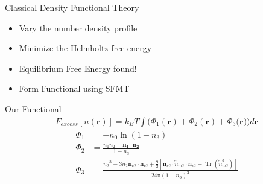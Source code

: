 \documentclass{beamer}
\renewcommand{\vec}[1]{\mathbf{#1}}
\begin{document}
\begin{frame}{Classical Density Functional Theory}
    \begin{itemize}
       \item Vary the number density profile 
       \item Minimize the Helmholtz free energy
       \item Equilibrium Free Energy found!
       \item Form Functional using SFMT
     \end{itemize}
\end{frame}


\begin{frame}{Our Functional}
\begin{align}\label{eq:Fexfunctional}
  F_{excess}[n(\vec{r})]=k_BT\int(\Phi_1(\vec{r})+\Phi_2(\vec{r})+\Phi_3(\vec{r}{)) d}\vec{r}
\end{align}
\begin{align}
\Phi_1 &= -n_{0}\ln(1-n_{3}) \\
\Phi_2 &= \frac{n_{1}n_{2}-\vec{n_{1}}\cdot\vec{n_{2}}}{1-n_{3}} \\
\Phi_3 &= \frac{{n_2}^3-3n_2\vec{n}_{v2}\cdot\vec{n}_{v2}+\frac{9}{2}[\vec{n}_{v2}\cdot{\overleftrightarrow{n}_{m2}}\cdot{\vec{n}_{v2}}-\operatorname{Tr}({\overleftrightarrow{n}^3_{m2}})]}{24\pi(1-n_3)^2}  
\end{align} 
\end{frame}





\end{document}
